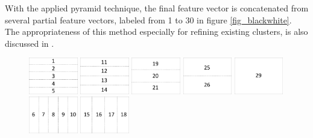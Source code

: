 With the applied pyramid technique, the final feature vector is concatenated from several partial feature vectors, labeled from 1 to 30 in figure \ref{fig_blackwhite}. The appropriateness of this method especially for refining existing clusters, is also discussed in \cite{Lazebnik2006}. 

\begin{figure}[h]
\centering
\includegraphics[width=0.19\textwidth]{images/partitioning5h.pdf}
\includegraphics[width=0.19\textwidth]{images/partitioning4h.pdf}
\includegraphics[width=0.19\textwidth]{images/partitioning3h.pdf}
\includegraphics[width=0.19\textwidth]{images/partitioning2h.pdf}
\includegraphics[width=0.19\textwidth]{images/partitioning1h.pdf}\vspace{1mm}
\includegraphics[width=0.19\textwidth]{images/partitioning5v.pdf}
\includegraphics[width=0.19\textwidth]{images/partitioning4v.pdf}

\end{figure}
